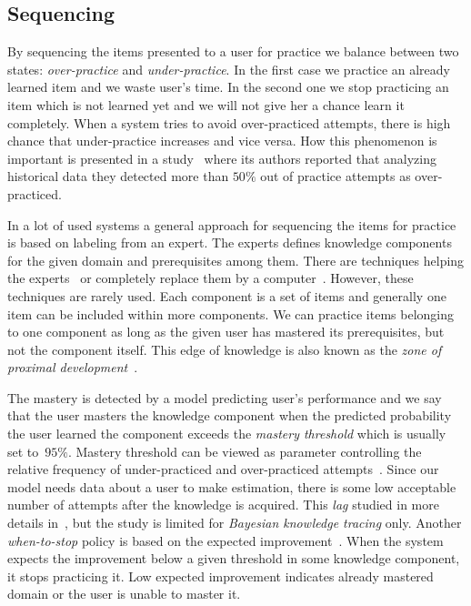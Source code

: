 \documentclass[table,color,cover,twoside,nolot,nolof]{fithesis3/fithesis3}
\begin{document}
\subsection{Sequencing}

By sequencing the items presented to a user for practice we balance between two
states: \emph{over-practice} and \emph{under-practice}. In the first case we
practice an already learned item and we waste user's time. In the second one we
stop practicing an item which is not learned yet and we will not give her a
chance learn it completely. When a system tries to avoid over-practiced
attempts, there is high chance that under-practice increases and vice versa.
How this phenomenon is important is presented in a study~\cite{cen2007over}
where its authors reported that analyzing historical data they detected more
than $50\%$ out of practice attempts as over-practiced.

In a lot of used systems a general approach for sequencing the items for
practice is based on labeling from an expert. The experts defines knowledge
components for the given domain and prerequisites among them. There are
techniques helping the ex\-perts~\cite{niznan2014using} or completely replace
them by a computer~\cite{boros2013automatic}. However, these techniques are
rarely used. Each component is a set of items and generally one item can be
included within more components. We can practice items belonging to one
component as long as the given user has mastered its prerequisites, but not the
component itself. This edge of knowledge is also known as the \emph{zone of
proximal development}~\cite{lee2005signifying}.

The mastery is detected by a model predicting user's performance and we say
that the user masters the knowledge component when the predicted probability
the user learned the component exceeds the \emph{mastery threshold} which is
usually set to~$95\%$. Mastery threshold can be viewed as parameter controlling
the relative frequency of under-practiced and over-practiced
attempts~\cite{fancsali2013optimal}. Since our model needs data about a user
to make estimation, there is some low acceptable number of attempts after the
knowledge is acquired. This \emph{lag} studied in more details
in~\cite{fancsali2013optimal}, but the study is limited for \emph{Bayesian
knowledge tracing} only. Another \emph{when-to-stop} policy is based on the
expected improvement~\cite{rollinson2015predictive}. When the system expects
the improvement below a given threshold in some knowledge component, it stops
practicing it. Low expected improvement indicates already mastered domain or
the user is unable to master it.
\end{document}
